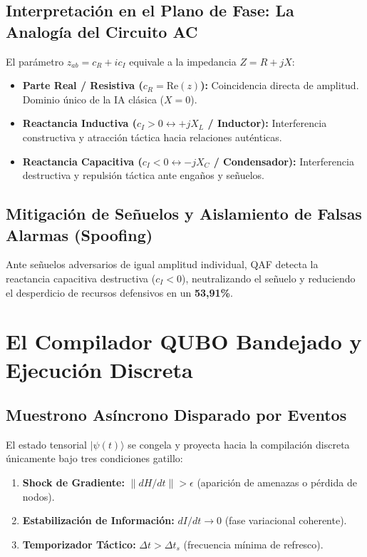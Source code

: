 \documentclass[11pt,a4paper,oneside]{report}
\begin{document}
\section{Interpretación en el Plano de Fase: La Analogía del Circuito AC}
El parámetro $z_{ab} = c_R + i c_I$ equivale a la impedancia $Z = R + jX$:
\begin{itemize}
    \item \textbf{Parte Real / Resistiva ($c_R = \text{Re}(z)$):} Coincidencia directa de amplitud. Dominio único de la IA clásica ($X = 0$).
    \item \textbf{Reactancia Inductiva ($c_I > 0 \leftrightarrow +jX_L$ / Inductor):} Interferencia constructiva y atracción táctica hacia relaciones auténticas.
    \item \textbf{Reactancia Capacitiva ($c_I < 0 \leftrightarrow -jX_C$ / Condensador):} Interferencia destructiva y repulsión táctica ante engaños y señuelos.
\end{itemize}

\section{Mitigación de Señuelos y Aislamiento de Falsas Alarmas (Spoofing)}
Ante señuelos adversarios de igual amplitud individual, QAF detecta la reactancia capacitiva destructiva ($c_I < 0$), neutralizando el señuelo y reduciendo el desperdicio de recursos defensivos en un \textbf{53,91\%}.


\chapter{El Compilador QUBO Bandejado y Ejecución Discreta}
\label{cap:compilador_qubo}

\section{Muestrono Asíncrono Disparado por Eventos}
El estado tensorial $|\psi(t)\rangle$ se congela y proyecta hacia la compilación discreta únicamente bajo tres condiciones gatillo:
\begin{enumerate}
    \item \textbf{Shock de Gradiente:} $\|dH/dt\| > \epsilon$ (aparición de amenazas o pérdida de nodos).
    \item \textbf{Estabilización de Información:} $dI/dt \to 0$ (fase variacional coherente).
    \item \textbf{Temporizador Táctico:} $\Delta t > \Delta t_s$ (frecuencia mínima de refresco).
\end{enumerate}
\end{document}
